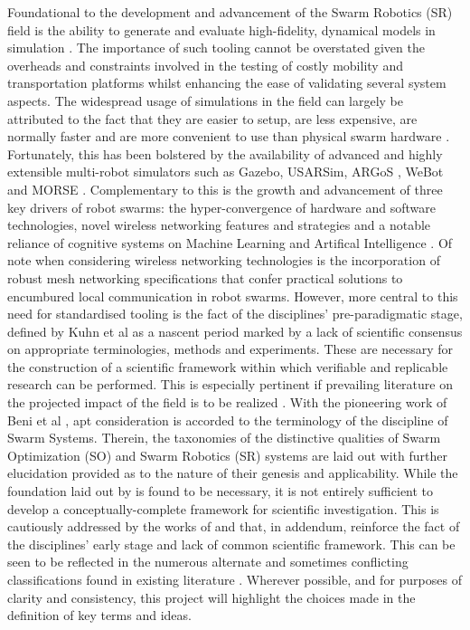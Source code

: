 \documentclass{report}
\begin{document}
Foundational to the development and advancement of the Swarm Robotics (SR) field is the ability to generate and evaluate high-fidelity, dynamical models in simulation \cite{Taylor2014}. The importance of such tooling cannot be overstated given the overheads and constraints involved in the testing of costly mobility and transportation platforms whilst enhancing the ease of validating several system aspects. The widespread usage of simulations in the field can largely be attributed to the fact that they are easier to setup, are less expensive, are normally faster and are more convenient to use than physical swarm hardware \cite{WeBot2004}. Fortunately, this has been bolstered by the availability of advanced and highly extensible multi-robot simulators such as Gazebo, USARSim, ARGoS \cite{Pinciroli2014}, WeBot and MORSE \cite{Morse2011}. Complementary to this is the growth and advancement of three key drivers of robot swarms: the hyper-convergence of hardware and software technologies, novel wireless networking features and strategies and a notable reliance of cognitive systems on Machine Learning and Artifical Intelligence \cite{Yang2018}. Of note when considering wireless networking technologies is the incorporation of robust mesh networking specifications \cite{Blue2018} that confer practical solutions to encumbured local communication in robot swarms. However, more central to this need for standardised tooling is the fact of the disciplines' pre-paradigmatic stage, defined by Kuhn et al \cite{Kuhn2015} as a nascent period marked by a lack of scientific consensus on appropriate terminologies, methods and experiments. These are necessary for the construction of a scientific framework within which verifiable and replicable research can be performed. This is especially pertinent if prevailing literature on the projected impact of the field is to be realized \cite{Yang2018}. With the pioneering work of Beni et al \cite{Beni2005a}, apt consideration is accorded to the terminology of the discipline of Swarm Systems. Therein, the taxonomies of the distinctive qualities of Swarm Optimization (SO) and Swarm Robotics (SR) systems are laid out with further elucidation provided as to the nature of their genesis and applicability. While the foundation laid out by \cite{Beni2005a} is found to be necessary, it is not entirely sufficient to develop a conceptually-complete framework for scientific investigation. This is cautiously addressed by the works of \cite{Iocchi2001} and \cite{Sahin2005} that, in addendum, reinforce the fact of the disciplines' early stage and lack of common scientific framework. This can be seen to be reflected in the numerous alternate and sometimes conflicting classifications found in existing literature \cite{Tan2013}. Wherever possible, and for purposes of clarity and consistency, this project will highlight the choices made in the definition of key terms and ideas.
\end{document}
